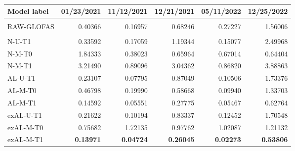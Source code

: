 \begin{center}
\scriptsize
\setlength{\tabcolsep}{4pt}
\begin{tabular}{>{\ttfamily}l rrrrr}
\toprule
Model label & 01/23/2021 & 11/12/2021 & 12/21/2021 & 05/11/2022 & 12/25/2022 \\
\midrule
\multicolumn{6}{l}{\textit{Raw forecast products}} \\
RAW-GLOFAS & 0.40366 & 0.16957 & 0.68246 & 0.27227 & 1.56006 \\
\midrule
\multicolumn{6}{l}{\textit{Bayesian benchmark variants}} \\
N-U-T1 & 0.33592 & 0.17059 & 1.19344 & 0.15077 & 2.49968 \\
N-M-T0 & 1.84333 & 0.38023 & 0.65964 & 0.67014 & 0.64404 \\
N-M-T1 & 3.21490 & 0.89096 & 3.04362 & 0.86820 & 3.88863 \\
AL-U-T1 & 0.23107 & 0.07795 & 0.87049 & 0.10506 & 1.73376 \\
AL-M-T0 & 0.46798 & 0.19990 & 0.58668 & 0.09940 & 1.33703 \\
AL-M-T1 & 0.14592 & 0.05551 & 0.27775 & 0.05467 & 0.62764 \\
exAL-U-T1 & 0.21622 & 0.10194 & 0.83337 & 0.12452 & 1.70548 \\
exAL-M-T0 & 0.75682 & 1.72135 & 0.97762 & 1.02087 & 1.21132 \\
exAL-M-T1 & \textbf{0.13971} & \textbf{0.04724} & \textbf{0.26045} & \textbf{0.02273} & \textbf{0.53806} \\
\bottomrule
\end{tabular}
\end{center}
